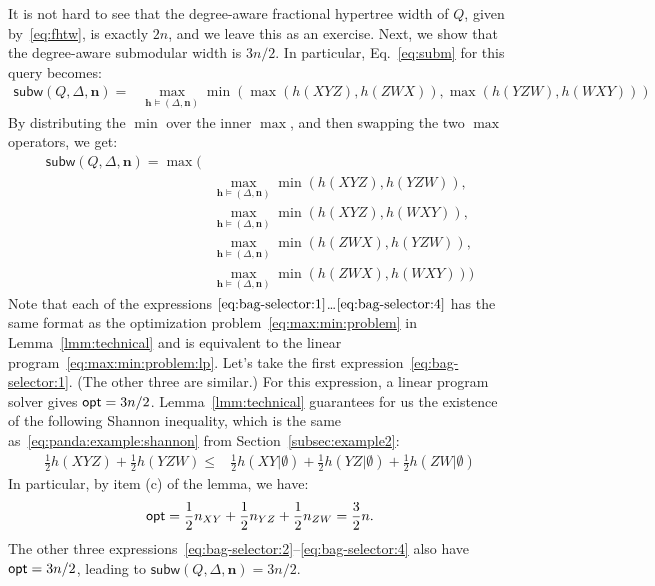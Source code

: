 \documentclass[10pt,a4paper]{article}
\newcommand{\opt}{\text{\sf opt}}
\newcommand{\subm}{\textsf{subw}}
\begin{document}
    It is not hard to see that the degree-aware fractional hypertree width of $Q$, given by~\eqref{eq:fhtw}, is exactly $2 n$, and we leave this as an exercise. Next, we show that the degree-aware submodular width is $3n/2$. In particular, Eq.~\eqref{eq:subm} for this query becomes:
    \begin{align*}
        \subm(Q, \Delta, \bm n) = & \max_{\bm h\models (\Delta, \bm n)}
        \min(\max(h(XYZ),h(ZWX)), \max(h(YZW), h(WXY)))
    \end{align*}
    By distributing the $\min$ over the inner $\max$, and then swapping the two $\max$ operators, we get:
    \begin{align}
        \subm(Q, \Delta, \bm n) = \max(&\nonumber\\
            & \max_{\bm h \models (\Delta, \bm n)} \min(h(XYZ), h(YZW)), \label{eq:bag-selector:1}\\
            & \max_{\bm h \models (\Delta, \bm n)} \min(h(XYZ), h(WXY)), \label{eq:bag-selector:2}\\
            & \max_{\bm h \models (\Delta, \bm n)} \min(h(ZWX), h(YZW)), \label{eq:bag-selector:3}\\
            & \max_{\bm h \models (\Delta, \bm n)} \min(h(ZWX), h(WXY))) \label{eq:bag-selector:4}
    \end{align}
    Note that each of the expressions $\eqref{eq:bag-selector:1}$\ldots$\eqref{eq:bag-selector:4}$
    has the same format as the optimization problem~\eqref{eq:max:min:problem} in Lemma~\ref{lmm:technical} and is equivalent to the linear program~\eqref{eq:max:min:problem:lp}.
    Let's take the first expression~\eqref{eq:bag-selector:1}. (The other three are similar.)
    For this expression, a linear program solver gives $\opt = 3n/2$. Lemma~\eqref{lmm:technical} guarantees for us the existence of the following Shannon inequality, which is the same as~\eqref{eq:panda:example:shannon} from Section~\ref{subsec:example2}:
    \begin{align*}
        \frac 1 2 h(XYZ) + \frac 1 2 h(YZW) \leq & \frac 1 2 h(XY|\emptyset)+\frac 1 2 h(YZ|\emptyset)+\frac 1 2 h(ZW|\emptyset)
      \end{align*}
      In particular, by item (c) of the lemma, we have:
      \[
        \opt = \frac{1}{2} n_{XY} + \frac{1}{2} n_{YZ} + \frac{1}{2} n_{ZW} = \frac{3}{2} n.
      \]
    The other three expressions~\eqref{eq:bag-selector:2}--\eqref{eq:bag-selector:4} also have
    $\opt = 3 n/2$, leading to $\subm(Q, \Delta, \bm n) = 3 n/ 2$.
\end{document}
